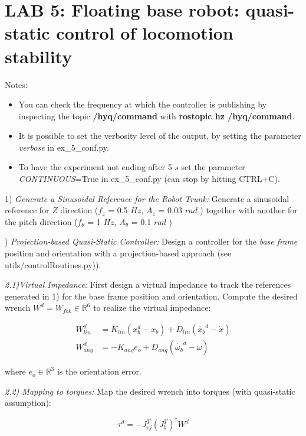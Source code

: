 \documentclass{report}
\newcommand{\Rnum}{\mathbb{R}} %
\begin{document}
\section*{LAB 5: Floating base robot: quasi-static control of locomotion stability}

Notes:
\begin{itemize}
	\item You can check the frequency at which the controller is publishing by inspecting the topic \textbf{/hyq/command} with \textbf{rostopic hz /hyq/command}.
	\item It is possible to set the verbosity level of the output, by setting the parameter  \textit{verbose} in  ex\_5\_conf.py.
	\item To have the experiment not ending after 5 $s$ set the parameter \textit{CONTINUOUS}=True in  ex\_5\_conf.py (can stop by hitting CTRL+C).
\end{itemize}

1) \textit{Generate a Sinusoidal Reference for the Robot Trunk:} 
Generate a sinusoidal reference for $Z$ direction ($f_z$ = 0.5 $Hz$, $A_z$ = 0.03 $rad$ )
together with another for the pitch direction ($f_{\theta}$ = 1 $Hz$, $A_{\theta}$ = 0.1 $rad$ )

\quad
 
) \textit{Projection-based Quasi-Static Controller:} 
Design a controller for the \textit{base frame} position and orientation with a projection-based approach (see utils/controlRoutines.py)).

\quad

\noindent  
 \textit{2.1)Virtual Impedance:}
First design a virtual impedance to track the references generated in 1) for the base frame position and orientation. 
Compute the desired wrench $W^d = W_{fbk} \in\Rnum^6$ to realize the virtual impedance:

\begin{align}
W^d_{lin} & = K_{lin} (x^d_b - x_b ) + D_{lin} (\dot{x_b}^d - \dot{x})   \\
W^d_{ang} &=  - K_{ang} e_o + D_{ang} (\dot{\omega_b}^d - \omega)
\end{align}

where $e_o \in \Rnum^3$ is the orientation error. 

\quad

\noindent  
\textit{2.2) Mapping to torques:}
Map the desired wrench into torques (with quasi-static assumption):

\begin{equation}
\tau^d = -J_{cj}^T(J_b^T)^{\dagger} W^d
\end{equation}
\end{document}
